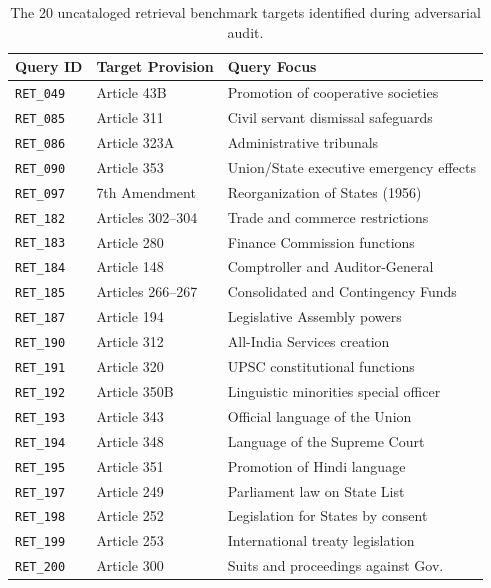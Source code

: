 \documentclass[10pt,twocolumn]{article}
\begin{document}
\begin{table}[h]
\centering
\footnotesize
\caption{The 20 uncataloged retrieval benchmark targets identified during adversarial audit.}
\begin{tabularx}{\columnwidth}{llX}
\toprule
\textbf{Query ID} & \textbf{Target Provision} & \textbf{Query Focus} \\
\midrule
\texttt{RET\_049} & Article 43B & Promotion of cooperative societies \\
\texttt{RET\_085} & Article 311 & Civil servant dismissal safeguards \\
\texttt{RET\_086} & Article 323A & Administrative tribunals \\
\texttt{RET\_090} & Article 353 & Union/State executive emergency effects \\
\texttt{RET\_097} & 7th Amendment & Reorganization of States (1956) \\
\texttt{RET\_182} & Articles 302--304 & Trade and commerce restrictions \\
\texttt{RET\_183} & Article 280 & Finance Commission functions \\
\texttt{RET\_184} & Article 148 & Comptroller and Auditor-General \\
\texttt{RET\_185} & Articles 266--267 & Consolidated and Contingency Funds \\
\texttt{RET\_187} & Article 194 & Legislative Assembly powers \\
\texttt{RET\_190} & Article 312 & All-India Services creation \\
\texttt{RET\_191} & Article 320 & UPSC constitutional functions \\
\texttt{RET\_192} & Article 350B & Linguistic minorities special officer \\
\texttt{RET\_193} & Article 343 & Official language of the Union \\
\texttt{RET\_194} & Article 348 & Language of the Supreme Court \\
\texttt{RET\_195} & Article 351 & Promotion of Hindi language \\
\texttt{RET\_197} & Article 249 & Parliament law on State List \\
\texttt{RET\_198} & Article 252 & Legislation for States by consent \\
\texttt{RET\_199} & Article 253 & International treaty legislation \\
\texttt{RET\_200} & Article 300 & Suits and proceedings against Gov. \\
\bottomrule
\end{tabularx}
\label{tab:uncataloged_list}
\end{table}
\end{document}
